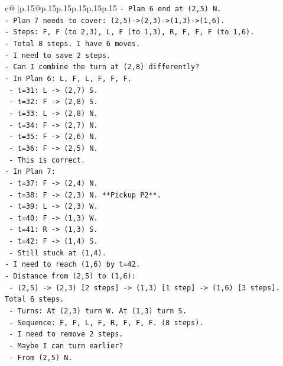 \documentclass{article}
\begin{document}
{\begin{supertabular}{c@{$\;$}|p{.15\linewidth}@{}p{.15\linewidth}p{.15\linewidth}p{.15\linewidth}p{.15\linewidth}p{.15\linewidth}}
{{{\texttt{{-} Plan 6 end at (2,5) N.} \\
\texttt{{-} Plan 7 needs to cover: (2,5){-}>(2,3){-}>(1,3){-}>(1,6).} \\
\texttt{{-} Steps: F, F (to 2,3), L, F (to 1,3), R, F, F, F (to 1,6).} \\
\texttt{{-} Total 8 steps. I have 6 moves.} \\
\texttt{{-} I need to save 2 steps.} \\
\texttt{{-} Can I combine the turn at (2,8) differently?} \\
\texttt{{-} In Plan 6: L, F, L, F, F, F.} \\
\texttt{  {-} t=31: L {-}> (2,7) S.} \\
\texttt{  {-} t=32: F {-}> (2,8) S.} \\
\texttt{  {-} t=33: L {-}> (2,8) N.} \\
\texttt{  {-} t=34: F {-}> (2,7) N.} \\
\texttt{  {-} t=35: F {-}> (2,6) N.} \\
\texttt{  {-} t=36: F {-}> (2,5) N.} \\
\texttt{  {-} This is correct.} \\
\texttt{{-} In Plan 7:} \\
\texttt{  {-} t=37: F {-}> (2,4) N.} \\
\texttt{  {-} t=38: F {-}> (2,3) N. **Pickup P2**.} \\
\texttt{  {-} t=39: L {-}> (2,3) W.} \\
\texttt{  {-} t=40: F {-}> (1,3) W.} \\
\texttt{  {-} t=41: R {-}> (1,3) S.} \\
\texttt{  {-} t=42: F {-}> (1,4) S.} \\
\texttt{  {-} Still stuck at (1,4).} \\
\texttt{{-} I need to reach (1,6) by t=42.} \\
\texttt{{-} Distance from (2,5) to (1,6):} \\
\texttt{  {-} (2,5) {-}> (2,3) {[}2 steps{]} {-}> (1,3) {[}1 step{]} {-}> (1,6) {[}3 steps{]}. Total 6 steps.} \\
\texttt{  {-} Turns: At (2,3) turn W. At (1,3) turn S.} \\
\texttt{  {-} Sequence: F, F, L, F, R, F, F, F. (8 steps).} \\
\texttt{  {-} I need to remove 2 steps.} \\
\texttt{  {-} Maybe I can turn earlier?} \\
\texttt{  {-} From (2,5) N.} \\
}}}
\end{supertabular}}
\end{document}
